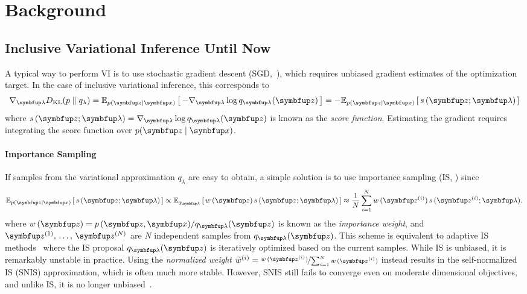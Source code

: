 
\section{Background}
\subsection{Inclusive Variational Inference Until Now}\label{section:ivi_previous}
A typical way to perform VI is to use stochastic gradient descent (SGD,~\citealt{robbins_stochastic_1951, bottou_online_1999}), which requires unbiased gradient estimates of the optimization target.
In the case of inclusive variational inference, this corresponds to 
%
\begin{align}
  \nabla_{\vlambda} \DKL{p}{q_{\lambda}}
  = \Esub{p(\vz\mid\vx)}{ - \nabla_{\vlambda} \log q_{\vlambda}(\vz) }
  = - \Esub{p(\vz\mid\vx)}{ s\,(\vz; \vlambda) }
\end{align}
where \(s\,(\vz; \vlambda) = \nabla_{\vlambda} \log q_{\vlambda}(\vz)\) is known as the \textit{score function}.
Estimating the gradient requires integrating the score function over \(p(\vz\mid\vx)\).

\paragraph{Importance Sampling}
If samples from the variational approximation \(q_{\lambda}\) are easy to obtain, a simple solution is to use importance sampling (IS, \citealt{robert_monte_2004, mcbook}) since 
\begin{align}
  \Esub{p(\vz\mid\vx)}{ s\,(\vz; \vlambda) }
  \propto \Esub{q_{\vlambda}}{ w\,(\vz) \, s\,(\vz; \vlambda) }
  \approx \frac{1}{N} \sum^{N}_{i=1} w\,(\vz^{(i)}) \, s\,(\vz^{(i)}; \vlambda) .
\end{align}
where \(w\,(\vz) = p\,(\vz,\vx) / q_{\vlambda}(\vz)\) is known as the \textit{importance weight}, and \(\vz^{(1)},\, \ldots,\, \vz^{(N)}\) are \(N\) independent samples from \(q_{\vlambda}(\vz)\).
This scheme is equivalent to adaptive IS methods~\citep{cappe_adaptive_2008, bugallo_adaptive_2017} where the IS proposal \(q_{\vlambda}(\vz)\) is iteratively optimized based on the current samples.
While IS is unbiased, it is remarkably unstable in practice.
Using the \textit{normalized weight} \(\widetilde{w}^{(i)} = \nicefrac{w\,(\vz^{(i)})}{\sum_{i=1}^N w\,(\vz^{(i)}) }\) instead results in the self-normalized IS (SNIS) approximation, which is often much more stable.
However, SNIS still fails to converge even on moderate dimensional objectives, and unlike IS, it is no longer unbiased~\citep{robert_monte_2004, mcbook}.

